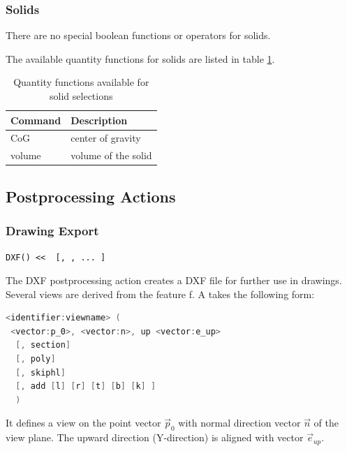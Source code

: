 \FloatBarrier

\subsubsection{Solids}

There are no special boolean functions or operators for solids.

The available quantity functions for solids are listed in table \ref{tab:iscad_feat_solids_qty}.

\begin{table}[h!]
\begin{tabular}{ll}
\hline
Command & Description \\
\hline\hline
    CoG                                     & center of gravity\\
    volume                                  & volume of the solid\\
\hline
\end{tabular}
\caption{Quantity functions available for solid selections}
\label{tab:iscad_feat_solids_qty}
\end{table}


\FloatBarrier

\subsection{Postprocessing Actions}

\subsubsection{Drawing Export}
\texttt{DXF() \textless\textless{ }   [, , ... ]}

The DXF postprocessing action creates a DXF file for further use in
drawings. Several views are derived from the feature f. A
 takes the following form:

\begin{lstlisting}[language=c++]
<identifier:viewname> (  
 <vector:p_0>, <vector:n>, up <vector:e_up>  
  [, section]  
  [, poly]  
  [, skiphl]  
  [, add [l] [r] [t] [b] [k] ]  
  )
\end{lstlisting}


It defines a view on the point vector $\vec p_0$ with normal direction vector $\vec n$
of the view plane. The upward direction (Y-direction) is aligned with
vector $\vec e_{up}$.

